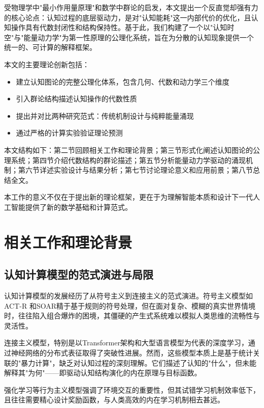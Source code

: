 \documentclass[12pt,a4paper]{article}
\begin{document}
受物理学中"最小作用量原理"和数学中群论的启发，本文提出一个反直觉却强有力的核心论点：认知过程的底层驱动力，是对"认知能耗"这一内部代价的优化，且认知操作具有代数封闭性和结构保持性。基于此，我们构建了一个以"认知时空"与"能量动力学"为第一性原理的公理化系统，旨在为分散的认知现象提供一个统一的、可计算的解释框架。

本文的主要理论创新包括：
\begin{itemize}
\item 建立认知图论的完整公理化体系，包含几何、代数和动力学三个维度
\item 引入群论结构描述认知操作的代数性质
\item 提出并对比两种研究范式：传统机制设计与纯粹能量涌现
\item 通过严格的计算实验验证理论预测
\end{itemize}

本文结构如下：第二节回顾相关工作和理论背景；第三节形式化阐述认知图论的公理系统；第四节介绍代数结构的群论描述；第五节分析能量动力学驱动的涌现机制；第六节详述实验设计与结果分析；第七节讨论理论意义和应用前景；第八节总结全文。

本工作的意义不仅在于提出新的理论框架，更在于为理解智能本质和设计下一代人工智能提供了新的数学基础和计算范式。

\section{相关工作和理论背景}

\subsection{认知计算模型的范式演进与局限}

认知计算模型的发展经历了从符号主义到连接主义的范式演进。符号主义模型如ACT-R \cite{anderson2004act} 和SOAR精于基于规则的符号处理，但在面对复杂、模糊的真实世界情境时，往往陷入组合爆炸的困境，其僵硬的产生式系统难以模拟人类思维的流畅性与灵活性。

连接主义模型，特别是以Transformer架构\cite{vaswani2017attention}和大型语言模型为代表的深度学习\cite{lecun2015deep}，通过神经网络的分布式表征取得了突破性进展。然而，这些模型本质上是基于统计关联的"暴力计算"，缺乏对认知过程的深刻理解。它们描述了认知的"什么"，但未能解释其"为何"——即驱动认知结构演化的内在原理与目标函数。

强化学习\cite{sutton2018reinforcement}等行为主义模型强调了环境交互的重要性，但其试错学习机制效率低下，且往往需要精心设计奖励函数，与人类高效的内在学习机制相去甚远。
\end{document}
